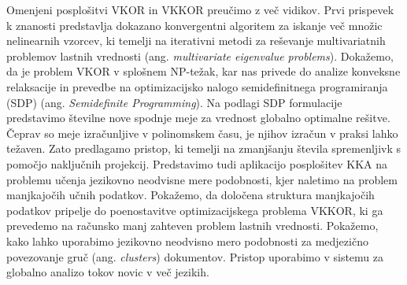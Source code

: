 Omenjeni posplošitvi VKOR in VKKOR preučimo z več vidikov. Prvi prispevek k znanosti predstavlja
dokazano konvergentni algoritem za iskanje več množic nelinearnih vzorcev,
ki temelji na iterativni metodi za reševanje multivariatnih problemov lastnih vrednosti (ang.
\emph{multivariate eigenvalue problems}). Dokažemo, da je problem VKOR v splošnem NP-težak,
kar nas privede do analize konveksne relaksacije in prevedbe na optimizacijsko nalogo
semidefinitnega programiranja (SDP) (ang. \emph{Semidefinite Programming}). Na podlagi
SDP formulacije predstavimo številne nove spodnje meje za vrednost globalno optimalne
rešitve. Čeprav so meje izračunljive v polinomskem času, je njihov izračun v praksi
lahko težaven. Zato predlagamo pristop, ki temelji na zmanjšanju števila spremenljivk s
pomočjo naključnih projekcij. Predstavimo tudi aplikacijo posplošitev KKA na problemu
učenja jezikovno neodvisne mere podobnosti, kjer naletimo na problem manjkajočih
učnih podatkov. Pokažemo, da določena struktura manjkajočih podatkov pripelje do
poenostavitve optimizacijskega problema VKKOR, ki ga prevedemo na računsko manj zahteven
problem lastnih vrednosti. Pokažemo, kako lahko uporabimo jezikovno neodvisno mero podobnosti
za medjezično povezovanje gruč (ang. \emph{clusters}) dokumentov. Pristop uporabimo v sistemu za globalno analizo
tokov novic v več jezikih.


